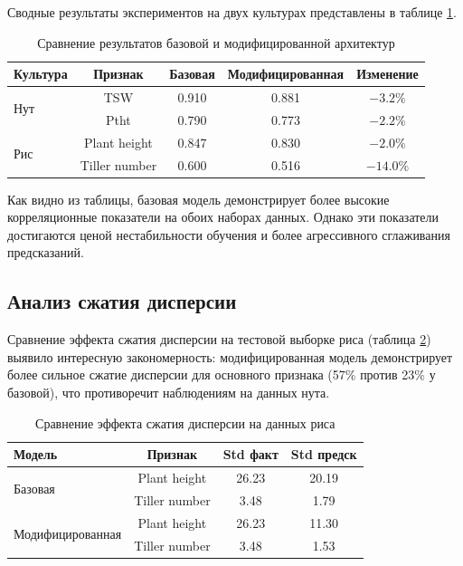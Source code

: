 Сводные результаты экспериментов на двух культурах представлены в 
таблице \ref{tab:results_comparison}.

\begin{table}
	\centering
	\small
	\caption{Сравнение результатов базовой и модифицированной архитектур}
	\label{tab:results_comparison}
	\begin{tabular}{|l|c|c|c|c|}
		\hline
		\textbf{Культура} & \textbf{Признак} & \textbf{Базовая} & \textbf{Модифицированная} & \textbf{Изменение} \\ \hline
		\multirow{2}{*}{Нут} & TSW & 0.910 & 0.881 & $-3.2\%$ \\ \cline{2-5}
		& Ptht & 0.790 & 0.773 & $-2.2\%$ \\ \hline
		\multirow{2}{*}{Рис} & Plant height & 0.847 & 0.830 & $-2.0\%$ \\ \cline{2-5}
		& Tiller number & 0.600 & 0.516 & $-14.0\%$ \\ \hline
	\end{tabular}
	\normalsize
\end{table}

Как видно из таблицы, базовая модель демонстрирует более высокие 
корреляционные показатели на обоих наборах данных. Однако эти 
показатели достигаются ценой нестабильности обучения и более 
агрессивного сглаживания предсказаний.

\subsection{Анализ сжатия дисперсии}

Сравнение эффекта сжатия дисперсии на тестовой выборке риса 
(таблица \ref{tab:variance_compression}) выявило интересную 
закономерность: модифицированная модель демонстрирует более 
сильное сжатие дисперсии для основного признака (57\% против 
23\% у базовой), что противоречит наблюдениям на данных нута.

\begin{table}
	\centering
	\caption{Сравнение эффекта сжатия дисперсии на данных риса}
	\label{tab:variance_compression}
	\begin{tabular}{|l|c|c|c|}
		\hline
		\textbf{Модель} & \textbf{Признак} & \textbf{Std факт} & \textbf{Std предск} \\ \hline
		\multirow{2}{*}{Базовая} & Plant height & 26.23 & 20.19 \\
		& Tiller number & 3.48 & 1.79 \\ \hline
		\multirow{2}{*}{Модифицированная} & Plant height & 26.23 & 11.30 \\
		& Tiller number & 3.48 & 1.53 \\ \hline
	\end{tabular}
\end{table}

